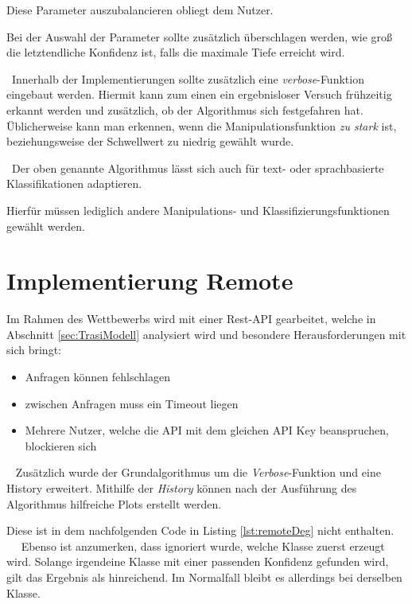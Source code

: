 Diese Parameter auszubalancieren obliegt dem Nutzer. 

Bei der Auswahl der Parameter sollte zusätzlich überschlagen werden, wie groß die letztendliche Konfidenz ist, falls die maximale Tiefe erreicht wird. 

~\newline Innerhalb der Implementierungen sollte zusätzlich eine \textit{verbose}-Funktion eingebaut werden. Hiermit kann zum einen ein ergebnisloser Versuch frühzeitig erkannt werden und zusätzlich, ob der Algorithmus sich festgefahren hat. Üblicherweise kann man erkennen, wenn die Manipulationsfunktion \textit{zu stark} ist, beziehungsweise der Schwellwert zu niedrig gewählt wurde.

~\newline Der oben genannte Algorithmus lässt sich auch für text- oder sprachbasierte Klassifikationen adaptieren. 

Hierfür müssen lediglich andere Manipulations- und Klassifizierungsfunktionen gewählt werden.
\newpage
\section{Implementierung Remote}
\label{sec:DegenerationRemote}
Im Rahmen des Wettbewerbs wird mit einer Rest-API gearbeitet, welche in Abschnitt \ref{sec:TrasiModell} analysiert wird und besondere Herausforderungen mit sich bringt: 

\begin{itemize}
	\item Anfragen können fehlschlagen
	\item zwischen Anfragen muss ein Timeout liegen
	\item Mehrere Nutzer, welche die API mit dem gleichen API Key beanspruchen, blockieren sich
\end{itemize}
~\newline
Zusätzlich wurde der Grundalgorithmus um die \textit{Verbose}-Funktion und eine History erweitert. Mithilfe der \textit{History} können nach der Ausführung des Algorithmus hilfreiche Plots erstellt werden. 

Diese ist in dem nachfolgenden Code in Listing \ref{lst:remoteDeg} nicht enthalten.
~\newline~\newline
Ebenso ist anzumerken, dass ignoriert wurde, welche Klasse zuerst erzeugt wird. Solange irgendeine Klasse mit einer passenden Konfidenz gefunden wird, gilt das Ergebnis als hinreichend. Im Normalfall bleibt es allerdings bei derselben Klasse. 

